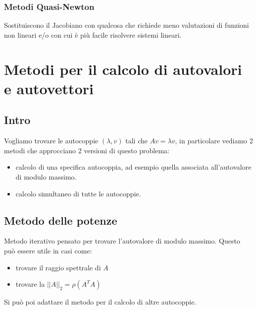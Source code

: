 \documentclass[12pt,a4paper,]{report}
\begin{document}
\subsection{Metodi Quasi-Newton}
Sostituiscono il Jacobiano con qualcosa che richiede meno valutazioni di funzioni non lineari e/o con cui è più facile risolvere sistemi lineari.

\chapter{Metodi per il calcolo di autovalori e autovettori}

\section{Intro}
Vogliamo trovare le autocoppie $(\lambda, v)$ tali che $Av=\lambda v$, in particolare vediamo 2 metodi che approcciano 2 versioni di  questo problema:
\begin{itemize}
    \item calcolo di una specifica autocoppia, ad esempio quella associata all'autovalore di modulo massimo.
    \item calcolo simultaneo di tutte le autocoppie.
\end{itemize}
\section{Metodo delle potenze}
Metodo iterativo pensato per trovare l'autovalore di modulo massimo. 
Questo può essere utile in casi come:
\begin{itemize}
    \item trovare il raggio spettrale di $A$
    \item trovare la $||A||_2= \rho(A^TA)$
\end{itemize}
Si può poi adattare il metodo per il calcolo di altre autocoppie.
\end{document}
